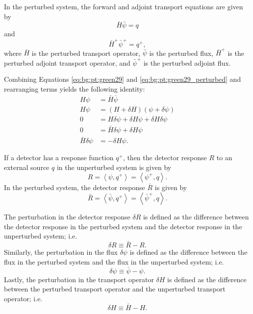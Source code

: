 In the perturbed system, the forward and adjoint transport equations are given by
\begin{equation}\label{eq:bg:pt:green29_perturbed}
  \bar{H}\bar{\psi} = q
\end{equation}
and
\begin{equation}\label{eq:bg:pt:green163_perturbed}
  \bar{H}^+\bar{\psi}^+ = q^+,
\end{equation}
where $\bar{H}$ is the perturbed transport operator, $\bar{\psi}$ is the perturbed flux, $\bar{H}^+$ is the perturbed adjoint transport operator, and $\bar{\psi}^+$ is the perturbed adjoint flux.

Combining Equations \ref{eq:bg:pt:green29} and \ref{eq:bg:pt:green29_perturbed} and rearranging terms yields the following identity:
\begin{equation}\label{eq:bg:pt:green44a}\begin{split}
  H\psi             & = \bar{H}\bar{\psi} \\
  H\psi             & = \left(H+\delta H\right)\left(\psi+\delta\psi\right) \\
  0                 & = H\delta\psi + \delta H\psi + \delta H\delta\psi \\
  0                 & = \bar{H}\delta\psi + \delta H\psi \\
  \bar{H}\delta\psi & = -\delta H\psi.
\end{split}\end{equation}

If a detector has a response function $q^+$, then the detector response $R$ to an external source $q$ in the unperturbed system is given by
\begin{equation}\label{eq:bg:pt:green168}
  R = \left<\psi,q^+\right>
    = \left<\psi^+,q\right>.
\end{equation}
In the perturbed system, the detector response $\bar{R}$ is given by
\begin{equation}\label{eq:bg:pt:r_bar}
  \bar{R} = \left<\bar{\psi},q^+\right>
          = \left<\bar{\psi}^+,q\right>.
\end{equation}

The perturbation in the detector response $\delta R$ is defined as the difference between the detector response in the perturbed system and the detector response in the unperturbed system; i.e.
\begin{equation}\label{eq:bg:pt:delta_r}
  \delta R \equiv \bar{R} - R.
\end{equation}
Similarly, the perturbation in the flux $\delta\psi$ is defined as the difference between the flux in the perturbed system and the flux in the unperturbed system; i.e.
\begin{equation}\label{eq:bg:pt:delta_psi}
  \delta \psi \equiv \bar{\psi} - \psi.
\end{equation}
Lastly, the perturbation in the transport operator $\delta H$ is defined as the difference between the perturbed transport operator and the unperturbed transport operator; i.e.
\begin{equation}\label{eq:bg:pt:delta_H}
  \delta H \equiv \bar{H} - H.
\end{equation}


